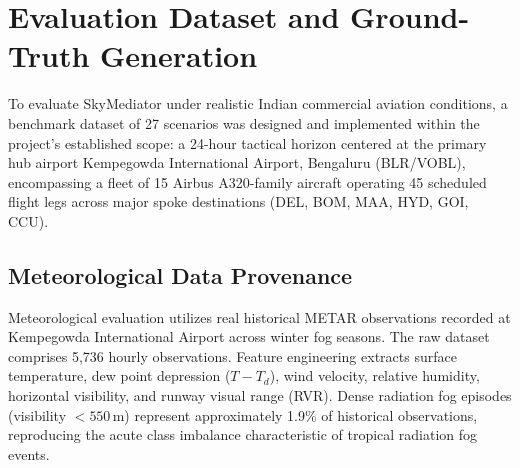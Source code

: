 \section{Evaluation Dataset and Ground-Truth Generation}
\label{sec:evaluation_dataset}

To evaluate SkyMediator under realistic Indian commercial aviation conditions, a benchmark dataset of 27 scenarios was designed and implemented within the project's established scope: a 24-hour tactical horizon centered at the primary hub airport Kempegowda International Airport, Bengaluru (BLR/VOBL), encompassing a fleet of 15 Airbus A320-family aircraft operating 45 scheduled flight legs across major spoke destinations (DEL, BOM, MAA, HYD, GOI, CCU).

\subsection{Meteorological Data Provenance}
Meteorological evaluation utilizes real historical METAR observations recorded at Kempegowda International Airport across winter fog seasons. The raw dataset comprises 5,736 hourly observations. Feature engineering extracts surface temperature, dew point depression ($T - T_d$), wind velocity, relative humidity, horizontal visibility, and runway visual range (RVR). Dense radiation fog episodes (visibility $<550\,$m) represent approximately 1.9\% of historical observations, reproducing the acute class imbalance characteristic of tropical radiation fog events.

